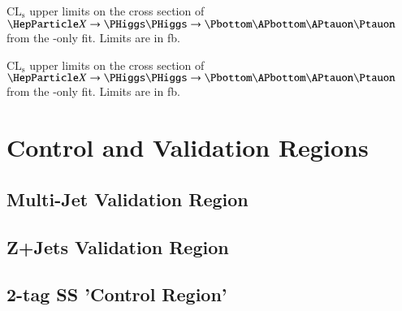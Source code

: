 \begin{table}[htbp]
  \centering

  
  \caption{$\text{CL}_\text{s}$ upper limits on the cross section of
    $\PX \ra \PHiggs \PHiggs \ra \bbtautau$ from the \hadhad-only
    fit. Limits are in fb.}
  \label{tab:hadhad_limits_resonant}
\end{table}


\begin{table}[htbp]
  \centering

  
  \caption{$\text{CL}_\text{s}$ upper limits on the cross section of
    $\PX \ra \PHiggs \PHiggs \ra \bbtautau$ from the \lephad-only
    fit. Limits are in fb.}
  \label{tab:lephad_limits_resonant}
\end{table}


\chapter{Control and Validation Regions}


\section{Multi-Jet Validation Region}

\section{Z+Jets Validation Region}

\section{2-tag SS 'Control Region'}

